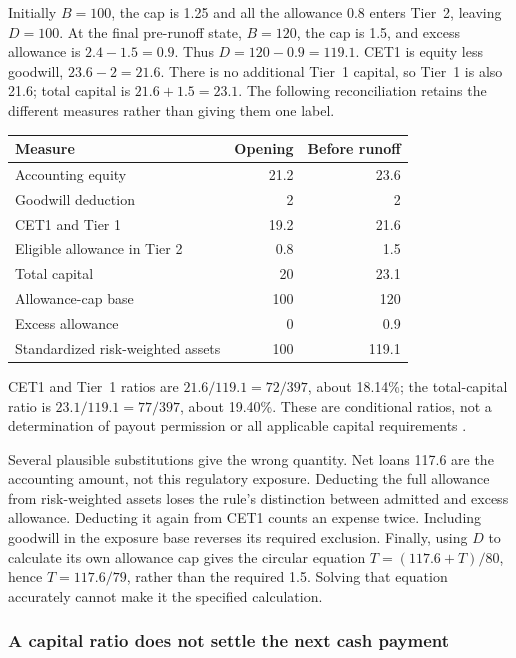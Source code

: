 Initially \(B=100\), the cap is 1.25 and all the allowance 0.8 enters
Tier~2, leaving \(D=100\). At the final pre-runoff state, \(B=120\), the
cap is 1.5, and excess allowance is \(2.4-1.5=0.9\). Thus
\(D=120-0.9=119.1\). CET1 is equity less goodwill, \(23.6-2=21.6\).
There is no additional Tier~1 capital, so Tier~1 is also 21.6; total
capital is \(21.6+1.5=23.1\). The following reconciliation retains the
different measures rather than giving them one label.
\begin{center}
\begin{tabular}{lrr}
\toprule
Measure & Opening & Before runoff\\
\midrule
Accounting equity & 21.2 & 23.6\\
Goodwill deduction & 2 & 2\\
CET1 and Tier 1 & 19.2 & 21.6\\
Eligible allowance in Tier 2 & 0.8 & 1.5\\
Total capital & 20 & 23.1\\
Allowance-cap base & 100 & 120\\
Excess allowance & 0 & 0.9\\
Standardized risk-weighted assets & 100 & 119.1\\
\bottomrule
\end{tabular}
\end{center}
CET1 and Tier~1 ratios are \(21.6/119.1=72/397\), about 18.14\%;
the total-capital ratio is \(23.1/119.1=77/397\), about 19.40\%.
These are conditional ratios, not a determination of payout permission or
all applicable capital requirements
\citep[12~CFR~3.10(b)(1)--(3)]{occcapitalratios2026}.

Several plausible substitutions give the wrong quantity. Net loans 117.6
are the accounting amount, not this regulatory exposure. Deducting the
full allowance from risk-weighted assets loses the rule's distinction
between admitted and excess allowance. Deducting it again from CET1
counts an expense twice. Including goodwill in the exposure base reverses
its required exclusion. Finally, using \(D\) to calculate its own
allowance cap gives the circular equation \(T=(117.6+T)/80\), hence
\(T=117.6/79\), rather than the required 1.5. Solving that equation
accurately cannot make it the specified calculation.

\subsubsection*{A capital ratio does not settle the next cash payment}

